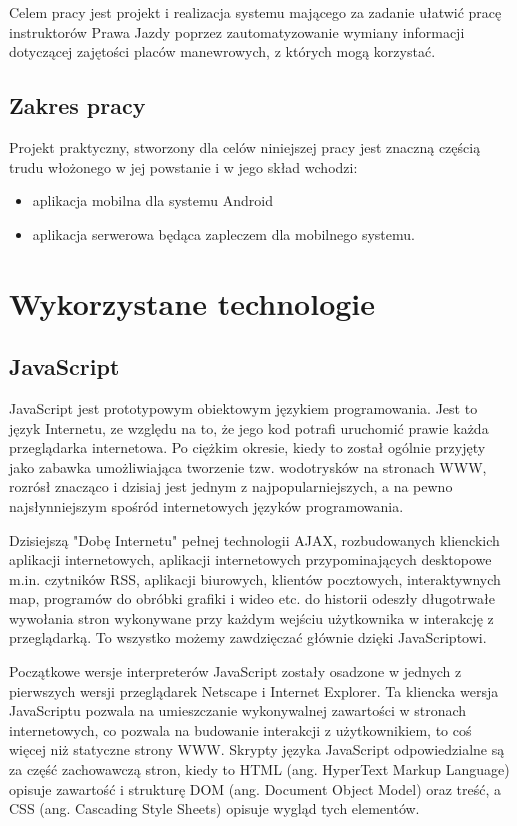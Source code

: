 \documentclass[twoside,a4paper]{book}
\begin{document}
Celem pracy jest projekt i realizacja systemu mającego za zadanie ułatwić pracę instruktorów Prawa Jazdy poprzez zautomatyzowanie wymiany informacji dotyczącej zajętości placów manewrowych, z których mogą korzystać.


\section{Zakres pracy}

Projekt praktyczny, stworzony dla celów niniejszej pracy jest znaczną częścią trudu włożonego w jej powstanie i w jego skład wchodzi:

\begin{itemize}
	\item aplikacja mobilna dla systemu Android
	\item aplikacja serwerowa będąca zapleczem dla mobilnego systemu.
\end{itemize}




\chapter{Wykorzystane technologie}

\section{JavaScript}

JavaScript jest prototypowym obiektowym językiem programowania. Jest to język Internetu, ze względu na to, że jego kod potrafi uruchomić prawie każda przeglądarka internetowa. Po ciężkim okresie, kiedy to został ogólnie przyjęty jako zabawka umożliwiająca tworzenie tzw. wodotrysków na stronach WWW, rozrósł znacząco i dzisiaj jest jednym z najpopularniejszych, a na pewno najsłynniejszym spośród internetowych języków programowania.

Dzisiejszą "Dobę Internetu" pełnej technologii AJAX, rozbudowanych klienckich aplikacji internetowych, aplikacji internetowych przypominających desktopowe m.in. czytników RSS, aplikacji biurowych, klientów pocztowych, interaktywnych map, programów do obróbki grafiki i wideo etc. do historii odeszły długotrwałe wywołania stron wykonywane przy każdym wejściu użytkownika  w interakcję z przeglądarką. To wszystko możemy zawdzięczać głównie dzięki JavaScriptowi.

Początkowe wersje interpreterów JavaScript zostały osadzone w jednych z pierwszych wersji przeglądarek Netscape i Internet Explorer. Ta kliencka wersja JavaScriptu pozwala na umieszczanie wykonywalnej zawartości w stronach internetowych, co pozwala na budowanie interakcji z użytkownikiem, to coś więcej niż statyczne strony WWW. Skrypty języka JavaScript odpowiedzialne są za część zachowawczą stron, kiedy to HTML (ang. HyperText Markup Language) opisuje zawartość i strukturę DOM (ang. Document Object Model) oraz treść, a CSS (ang. Cascading Style Sheets) opisuje wygląd tych elementów.
\end{document}
